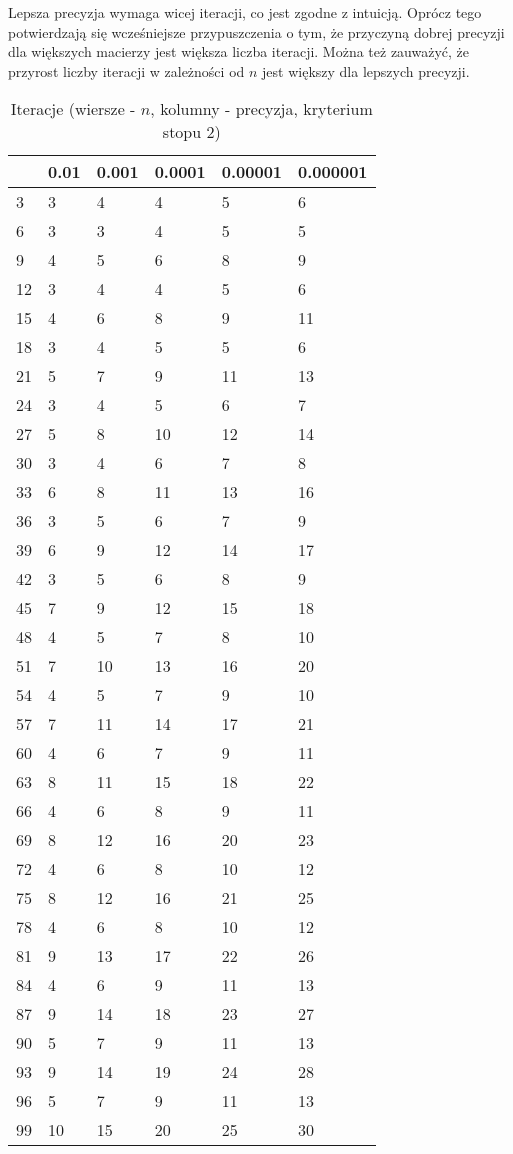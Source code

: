 \documentclass{article}
\begin{document}
Lepsza precyzja wymaga wicej iteracji, co jest zgodne z intuicją. Oprócz tego potwierdzają się wcześniejsze przypuszczenia
o tym, że przyczyną dobrej precyzji dla większych macierzy jest większa liczba iteracji. Można też zauważyć, że przyrost
liczby iteracji w zależności od $n$ jest większy dla lepszych precyzji.

\begin{table}[H]
\centering
\begin{tabular}{|l|l|l|l|l|l|}
\hline
& 0.01 & 0.001 & 0.0001 & 0.00001 & 0.000001 \\ \hline
3 & 3 & 4 & 4 & 5 & 6 \\ \hline
6 & 3 & 3 & 4 & 5 & 5 \\ \hline
9 & 4 & 5 & 6 & 8 & 9 \\ \hline
12 & 3 & 4 & 4 & 5 & 6 \\ \hline
15 & 4 & 6 & 8 & 9 & 11 \\ \hline
18 & 3 & 4 & 5 & 5 & 6 \\ \hline
21 & 5 & 7 & 9 & 11 & 13 \\ \hline
24 & 3 & 4 & 5 & 6 & 7 \\ \hline
27 & 5 & 8 & 10 & 12 & 14 \\ \hline
30 & 3 & 4 & 6 & 7 & 8 \\ \hline
33 & 6 & 8 & 11 & 13 & 16 \\ \hline
36 & 3 & 5 & 6 & 7 & 9 \\ \hline
39 & 6 & 9 & 12 & 14 & 17 \\ \hline
42 & 3 & 5 & 6 & 8 & 9 \\ \hline
45 & 7 & 9 & 12 & 15 & 18 \\ \hline
48 & 4 & 5 & 7 & 8 & 10 \\ \hline
51 & 7 & 10 & 13 & 16 & 20 \\ \hline
54 & 4 & 5 & 7 & 9 & 10 \\ \hline
57 & 7 & 11 & 14 & 17 & 21 \\ \hline
60 & 4 & 6 & 7 & 9 & 11 \\ \hline
63 & 8 & 11 & 15 & 18 & 22 \\ \hline
66 & 4 & 6 & 8 & 9 & 11 \\ \hline
69 & 8 & 12 & 16 & 20 & 23 \\ \hline
72 & 4 & 6 & 8 & 10 & 12 \\ \hline
75 & 8 & 12 & 16 & 21 & 25 \\ \hline
78 & 4 & 6 & 8 & 10 & 12 \\ \hline
81 & 9 & 13 & 17 & 22 & 26 \\ \hline
84 & 4 & 6 & 9 & 11 & 13 \\ \hline
87 & 9 & 14 & 18 & 23 & 27 \\ \hline
90 & 5 & 7 & 9 & 11 & 13 \\ \hline
93 & 9 & 14 & 19 & 24 & 28 \\ \hline
96 & 5 & 7 & 9 & 11 & 13 \\ \hline
99 & 10 & 15 & 20 & 25 & 30 \\ \hline
\end{tabular}
\caption{Iteracje (wiersze - $n$, kolumny - precyzja, kryterium stopu 2)}
\end{table}
\end{document}
